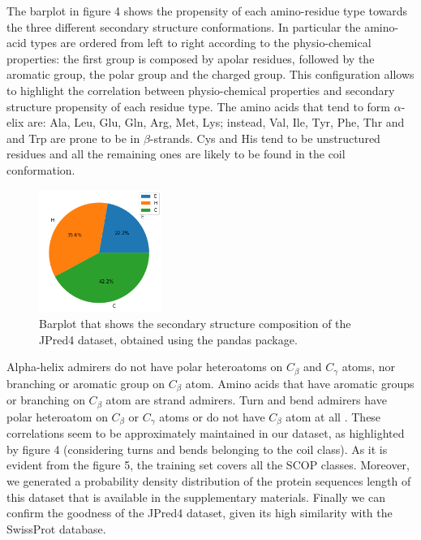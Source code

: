 \documentclass[nocrop]{bioinfo}
\begin{document}
\begin{methods}
The barplot in figure 4 shows the propensity of each amino-residue type towards the three different secondary structure conformations. In particular the amino-acid types are ordered from left to right according to the physio-chemical properties: the first group is composed by apolar residues, followed by the aromatic group, the polar group and the charged group. This configuration allows to highlight the correlation between physio-chemical properties and secondary structure propensity of each residue type. The amino acids that tend to form $\alpha$-elix are: Ala, Leu, Glu, Gln, Arg, Met, Lys; instead, Val, Ile, Tyr, Phe, Thr and and Trp are prone to be in $\beta$-strands. Cys and His tend to be unstructured residues and all the remaining ones are likely to be found in the coil conformation. 
\begin{figure}[!tbh]%
\centering
\includegraphics[width=4cm, height=4cm]{./plotsJPred4/ss_composition.png}
\vspace{-15pt}
\caption{Barplot that shows the secondary structure composition of the JPred4 dataset, obtained using the pandas package.}\label{fig:03}
\end{figure}
Alpha-helix admirers do not have polar heteroatoms on $C_{\beta}$ and $C_{\gamma}$ atoms, nor branching or aromatic group on $C_{\beta}$ atom. Amino acids that have aromatic groups or branching on $C_{\beta}$ atom are strand admirers. Turn and bend admirers have polar heteroatom on $C_{\beta}$ or $C_{\gamma}$ atoms or do not have $C_{\beta}$ atom at all \citep{malkov2005correlations}. These correlations seem to be approximately maintained in our dataset, as highlighted by figure 4 (considering turns and bends belonging to the coil class). 
As it is evident from the figure 5, the training set covers all the SCOP classes. Moreover, we generated a probability density distribution of the protein sequences length of this dataset that is available in the supplementary materials. Finally we can confirm the goodness of the JPred4 dataset, given its high similarity with the SwissProt database. 

\end{methods}
\end{document}
